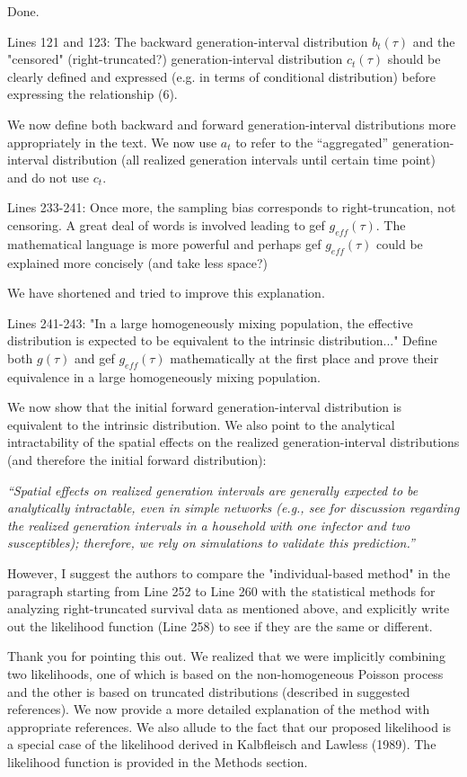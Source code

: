 \documentclass[12pt]{article}
\newcommand{\revtext}{\textsf}
\newcommand{\newtext}[1]{\textsl{``#1''}}
\begin{document}
Done.

\revtext{
Lines 121 and 123: The backward generation-interval distribution $b_t(\tau)$ and
the "censored" (right-truncated?) generation-interval distribution $c_t(\tau)$
should be clearly defined and expressed (e.g. in terms of conditional distribution) before expressing the relationship (6).
}

We now define both backward and forward generation-interval distributions more appropriately in the text.
We now use $a_t$ to refer to the ``aggregated'' generation-interval distribution (all realized generation intervals until certain time point) and do not use $c_t$.

\revtext{
Lines 233-241: Once more, the sampling bias corresponds to right-truncation,
not censoring. A great deal of words is involved leading to gef $g_{eff}(\tau)$. The
mathematical language is more powerful and perhaps gef $g_{eff}(\tau)$ could be
explained more concisely (and take less space?)
}

We have shortened and tried to improve this explanation. 

\revtext{Lines 241-243: "In a large homogeneously mixing population, the effective
distribution is expected to be equivalent to the intrinsic distribution..."
Define both $g(\tau)$ and gef $g_{eff}(\tau)$ mathematically at the first place and prove
their equivalence in a large homogeneously mixing population.}

We now show that the initial forward generation-interval distribution is equivalent to the intrinsic distribution.
We also point to the analytical intractability of the spatial effects on the realized generation-interval distributions (and therefore the initial forward distribution):

\newtext{Spatial effects on realized generation intervals are generally expected to be analytically intractable, even in simple networks (e.g., see \cite{tomba2010some} for discussion regarding the realized generation intervals in a household with one infector and two susceptibles); therefore, we rely on simulations to validate this prediction.}

\revtext{However, I suggest the authors to compare the "individual-based
method" in the paragraph starting from Line 252 to Line 260 with the statistical methods for analyzing right-truncated survival data as mentioned
above, and explicitly write out the likelihood function (Line 258) to see if
they are the same or different.}

Thank you for pointing this out. 
We realized that we were implicitly combining two likelihoods, one of which is based on the non-homogeneous Poisson process and the other is based on truncated distributions (described in suggested references).
We now provide a more detailed explanation of the method with appropriate references.
We also allude to the fact that our proposed likelihood is a special case of the likelihood derived in Kalbfleisch and Lawless (1989).
The likelihood function is provided in the Methods section.
\end{document}
